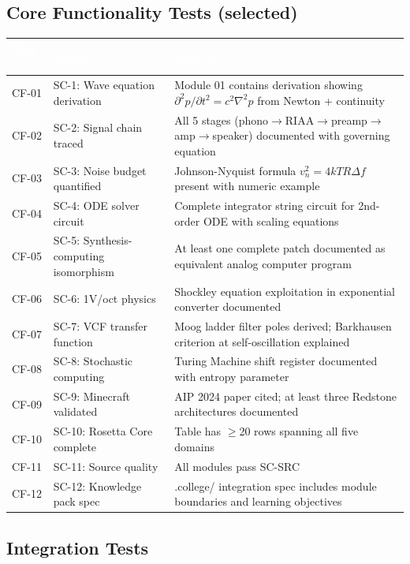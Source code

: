 \documentclass[11pt,letterpaper]{article}
\newcommand{\tableheader}[1]{\textbf{\sffamily\textcolor{white}{#1}}}
\begin{document}
\subsection{Core Functionality Tests (selected)}

\begin{center}
\begin{tabularx}{\textwidth}{C{1.5cm}L{4cm}X}
\toprule
{}
\tableheader{Test ID} & \tableheader{Verifies SC} & \tableheader{Expected} \\
\midrule
CF-01 & SC-1: Wave equation derivation & Module 01 contains derivation showing $\partial^2 p/\partial t^2 = c^2 \nabla^2 p$ from Newton + continuity \\
CF-02 & SC-2: Signal chain traced & All 5 stages (phono$\to$RIAA$\to$preamp$\to$amp$\to$speaker) documented with governing equation \\
CF-03 & SC-3: Noise budget quantified & Johnson-Nyquist formula $v_n^2 = 4kTR\Delta f$ present with numeric example \\
CF-04 & SC-4: ODE solver circuit & Complete integrator string circuit for 2nd-order ODE with scaling equations \\
CF-05 & SC-5: Synthesis-computing isomorphism & At least one complete patch documented as equivalent analog computer program \\
CF-06 & SC-6: 1V/oct physics & Shockley equation exploitation in exponential converter documented \\
CF-07 & SC-7: VCF transfer function & Moog ladder filter poles derived; Barkhausen criterion at self-oscillation explained \\
CF-08 & SC-8: Stochastic computing & Turing Machine shift register documented with entropy parameter \\
CF-09 & SC-9: Minecraft validated & AIP 2024 paper cited; at least three Redstone architectures documented \\
CF-10 & SC-10: Rosetta Core complete & Table has $\geq$20 rows spanning all five domains \\
CF-11 & SC-11: Source quality & All modules pass SC-SRC \\
CF-12 & SC-12: Knowledge pack spec & .college/ integration spec includes module boundaries and learning objectives \\
\bottomrule
\end{tabularx}
\end{center}

\subsection{Integration Tests}
\end{document}

